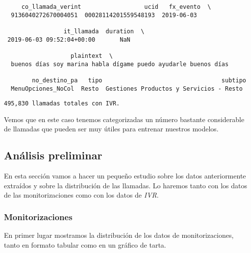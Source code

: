     
    \begin{verbatim}
     co_llamada_verint                  ucid   fx_evento  \
  9136040272670004051  00028114201559548193  2019-06-03   

                 it_llamada  duration  \
 2019-06-03 09:52:04+00:00       NaN   

                   plaintext  \
  buenos días soy marina habla dígame puedo ayudarle buenos días

        no_destino_pa   tipo                                  subtipo  
  MenuOpciones_NoCol  Resto  Gestiones Productos y Servicios - Resto  
    \end{verbatim}

    
    \begin{Verbatim}[commandchars=\\\{\}]
495,830 llamadas totales con IVR.
    \end{Verbatim}

    Vemos que en este caso tenemos categorizadas un número bastante considerable de
llamadas que pueden ser muy útiles para entrenar nuestros modelos.


\subsection{Análisis preliminar}
\label{section:data:ana:pre}


    En esta sección vamos a hacer un pequeño estudio sobre los datos
anteriormente extraídos y sobre la distribución de las llamadas. Lo haremos tanto con los datos de las
monitorizaciones como con los datos de \textit{IVR}.

\subsubsection{Monitorizaciones}

En primer lugar mostramos la distribución de los datos de monitorizaciones, tanto en formato tabular como en un gráfico de tarta.
\vspace{0.5cm}

